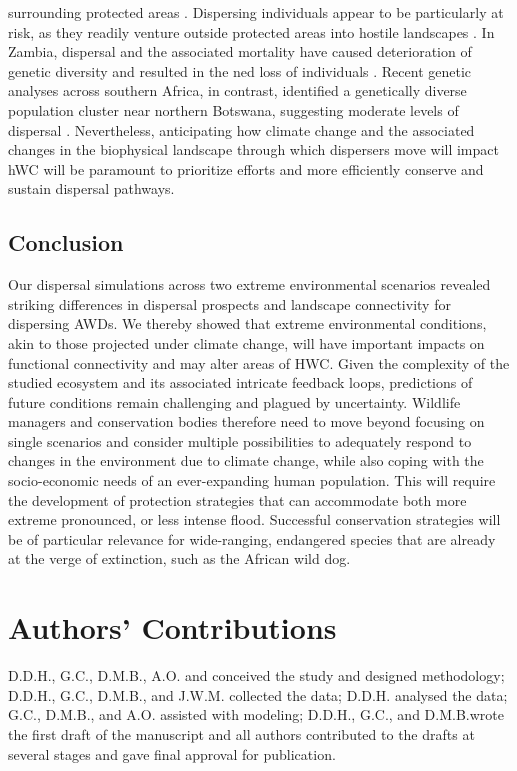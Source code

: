 \documentclass[abstract=on,10pt,a4paper,bibliography=totocnumbered]{article}
\begin{document}
surrounding protected areas \citep{Woodroffe.1998, Northrup.2012}. Dispersing
individuals appear to be particularly at risk, as they readily venture outside
protected areas into hostile landscapes \citep{Elliot.2014, Cozzi.2020}. In
Zambia, dispersal and the associated mortality have caused deterioration of
genetic diversity and resulted in the ned loss of individuals
\citep{Leigh.2012}. Recent genetic analyses across southern Africa, in contrast,
identified a genetically diverse population cluster near northern Botswana,
suggesting moderate levels of dispersal \citep{Tensen.2022}. Nevertheless,
anticipating how climate change and the associated changes in the biophysical
landscape through which dispersers move will impact hWC will be paramount to
prioritize efforts and more efficiently conserve and sustain dispersal pathways.

\subsection{Conclusion}
Our dispersal simulations across two extreme environmental scenarios revealed
striking differences in dispersal prospects and landscape connectivity for
dispersing AWDs. We thereby showed that extreme environmental conditions, akin
to those projected under climate change, will have important impacts on
functional connectivity and may alter areas of HWC. Given the complexity of the
studied ecosystem and its associated intricate feedback loops, predictions of
future conditions remain challenging and plagued by uncertainty. Wildlife
managers and conservation bodies therefore need to move beyond focusing on
single scenarios and consider multiple possibilities to adequately respond to
changes in the environment due to climate change, while also coping with the
socio-economic needs of an ever-expanding human population. This will require
the development of protection strategies that can accommodate both more extreme
pronounced, or less intense flood. Successful conservation strategies will be of
particular relevance for wide-ranging, endangered species that are already at
the verge of extinction, such as the African wild dog.

\section{Authors' Contributions}
D.D.H., G.C., D.M.B., A.O. and conceived the study and designed methodology;
D.D.H., G.C., D.M.B., and J.W.M. collected the data; D.D.H. analysed the data;
G.C., D.M.B., and A.O. assisted with modeling; D.D.H., G.C., and D.M.B.wrote the
first draft of the manuscript and all authors contributed to the drafts at
several stages and gave final approval for publication.
\end{document}
